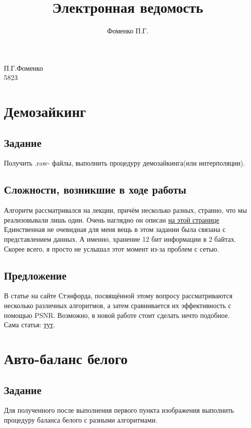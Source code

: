 \documentclass[a4paper,14pt]{extarticle} %
\author{Фоменко П.Г.}
\title{Электронная ведомость}
\begin{document}
\begin{flushright}
П.Г.Фоменко\\
5823
\end{flushright}

\section{Демозайкинг}

\subsection{Задание}
Получить .raw- файлы, выполнить процедуру демозайкинга(или интерполяции).\\

\subsection{Сложности, возникшие в ходе работы}
Алгоритм рассматривался на лекции, причём несколько разных, странно, что мы реализовывали лишь один. Очень наглядно он описан \href{https://medium.com/swlh/image-demosaicing-bilinear-interpolation-vs-high-quality-linear-interpolation-5fd2268c4c7a}{на этой странице} \\
Единственная не очевидная для меня вещь в этом задании была связана с представлением данных. А именно, хранение 12 бит информации в 2 байтах. Скорее всего, я просто не услышал этот момент из-за проблем с сетью.\\

\subsection{Предложение}
В статье на сайте Стэнфорда, посвящённой этому вопросу рассматриваются несколько различных алгоритмов, а затем сравнивается их эффективность с помощью PSNR. Возможно, в новой работе стоит сделать нечто подобное.\\
Сама статья: \href{https://stanford.edu/class/ee367/reading/Demosaicing_ICASSP04.pdf}{тут}.\\

\pagebreak

\section{Авто-баланс белого}

\subsection{Задание}
Для полученного после выполнения первого пункта изображения выполнить процедуру баланса белого с разными алгоритмами.\\
\end{document}
